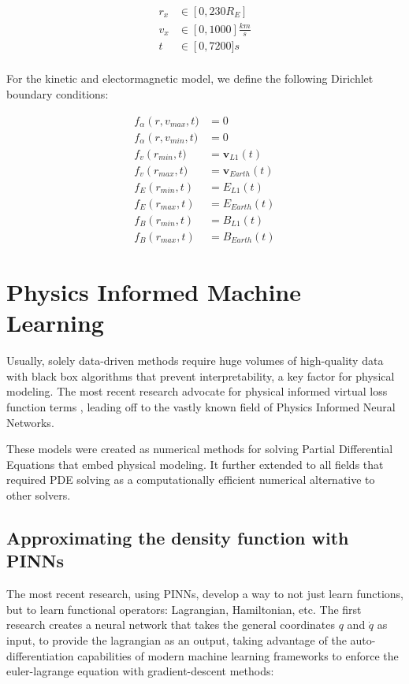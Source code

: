 \documentclass[12pt]{article}
\begin{document}
\begin{align*}
    r_x &\in \left[0, 230R_E\right] \\
    v_x &\in \left[0, 1000\right]\frac{km}{s} \\
    t &\in \left[0, 7200]s \\
\end{align*}

For the kinetic and electormagnetic model, we define the following Dirichlet boundary conditions:

\begin{align*}
    f_\alpha\left(r, v_{max}, t) &= 0 \\
    f_\alpha\left(r, v_{min}, t) &= 0 \\
    f_v\left(r_{min}, t) &= \mathbf{v}_{L1}(t) \\
    f_v\left(r_{max}, t) &= \mathbf{v}_{Earth}(t) \\
    f_E\left(r_{min}, t\right) &= E_{L1}(t) \\
    f_E\left(r_{max}, t\right) &= E_{Earth}(t) \\
    f_B\left(r_{min}, t\right) &= B_{L1}(t) \\
    f_B\left(r_{max}, t\right) &= B_{Earth}(t)
\end{align*}

\section{Physics Informed Machine Learning}
Usually, solely data-driven methods require huge volumes of high-quality data with black box algorithms that prevent interpretability, a key factor for physical modeling. The most recent research advocate for physical informed virtual loss function terms \cite{}, leading off to the vastly known field of Physics Informed Neural Networks.

These models were created as numerical methods for solving Partial Differential Equations that embed physical modeling. It further extended to all fields that required PDE solving as a computationally efficient numerical alternative to other solvers.

\subsection{Approximating the density function with PINNs}
The most recent research, using PINNs, develop a way to not just learn functions, but to learn functional operators: Lagrangian, Hamiltonian, etc. \cite{cranmer2020lagrangianneuralnetworks, greydanus2019hamiltonianneuralnetworks} The first research creates a neural network that takes the general coordinates $q$ and $\dot q$ as input, to provide the lagrangian as an output, taking advantage of the auto-differentiation capabilities of modern machine learning frameworks to enforce the euler-lagrange equation with gradient-descent methods:
\end{document}
